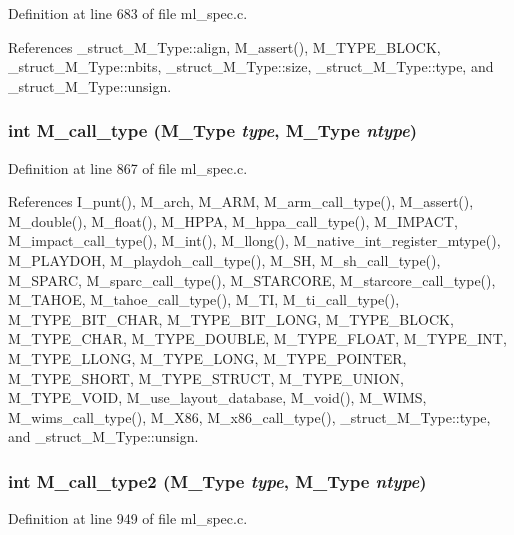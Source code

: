 Definition at line 683 of file ml\_\-spec.c.

References \_\-struct\_\-M\_\-Type::align, M\_\-assert(), M\_\-TYPE\_\-BLOCK, \_\-struct\_\-M\_\-Type::nbits, \_\-struct\_\-M\_\-Type::size, \_\-struct\_\-M\_\-Type::type, and \_\-struct\_\-M\_\-Type::unsign.
\subsubsection{\setlength{\rightskip}{0pt plus 5cm}int M\_\-call\_\-type (\bf{M\_\-Type} {\em type}, \bf{M\_\-Type} {\em ntype})}\label{ml__spec_8c_2aae03c2abaef2f5f46b6933af6bc007}




Definition at line 867 of file ml\_\-spec.c.

References I\_\-punt(), M\_\-arch, M\_\-ARM, M\_\-arm\_\-call\_\-type(), M\_\-assert(), M\_\-double(), M\_\-float(), M\_\-HPPA, M\_\-hppa\_\-call\_\-type(), M\_\-IMPACT, M\_\-impact\_\-call\_\-type(), M\_\-int(), M\_\-llong(), M\_\-native\_\-int\_\-register\_\-mtype(), M\_\-PLAYDOH, M\_\-playdoh\_\-call\_\-type(), M\_\-SH, M\_\-sh\_\-call\_\-type(), M\_\-SPARC, M\_\-sparc\_\-call\_\-type(), M\_\-STARCORE, M\_\-starcore\_\-call\_\-type(), M\_\-TAHOE, M\_\-tahoe\_\-call\_\-type(), M\_\-TI, M\_\-ti\_\-call\_\-type(), M\_\-TYPE\_\-BIT\_\-CHAR, M\_\-TYPE\_\-BIT\_\-LONG, M\_\-TYPE\_\-BLOCK, M\_\-TYPE\_\-CHAR, M\_\-TYPE\_\-DOUBLE, M\_\-TYPE\_\-FLOAT, M\_\-TYPE\_\-INT, M\_\-TYPE\_\-LLONG, M\_\-TYPE\_\-LONG, M\_\-TYPE\_\-POINTER, M\_\-TYPE\_\-SHORT, M\_\-TYPE\_\-STRUCT, M\_\-TYPE\_\-UNION, M\_\-TYPE\_\-VOID, M\_\-use\_\-layout\_\-database, M\_\-void(), M\_\-WIMS, M\_\-wims\_\-call\_\-type(), M\_\-X86, M\_\-x86\_\-call\_\-type(), \_\-struct\_\-M\_\-Type::type, and \_\-struct\_\-M\_\-Type::unsign.
\subsubsection{\setlength{\rightskip}{0pt plus 5cm}int M\_\-call\_\-type2 (\bf{M\_\-Type} {\em type}, \bf{M\_\-Type} {\em ntype})}\label{ml__spec_8c_c6d8e30b58131897fc7381b8e2e8d332}




Definition at line 949 of file ml\_\-spec.c.

